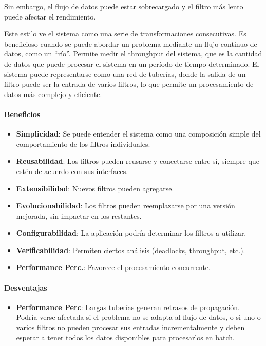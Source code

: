 \documentclass{article}
\begin{document}
			Sin embargo, el flujo de datos puede estar sobrecargado y el filtro más lento puede afectar el rendimiento.
			
			Este estilo ve el sistema como una serie de transformaciones consecutivas. Es beneficioso cuando se puede abordar un problema mediante un flujo continuo de datos, como un ``río''. Permite medir el throughput del sistema, que es la cantidad de datos que puede procesar el sistema en un período de tiempo determinado. El sistema puede representarse como una red de tuberías, donde la salida de un filtro puede ser la entrada de varios filtros, lo que permite un procesamiento de datos más complejo y eficiente.
			\paragraph{Beneficios}
				\begin{itemize}	
					\item {\textbf{Simplicidad}}: Se puede entender el sistema como una composición
					simple del comportamiento de los filtros individuales.
					\item {\textbf{Reusabilidad}}: Los filtros pueden reusarse y conectarse entre sí,
					siempre que estén de acuerdo con sus interfaces.
					\item {\textbf{Extensibilidad}}: Nuevos filtros pueden agregarse.
					\item {\textbf{Evolucionabilidad}}: Los filtros pueden reemplazarse por una versión
					mejorada, sin impactar en los restantes.
					\item {\textbf{Configurabilidad}}: La aplicación podría determinar los filtros a utilizar.
					\item {\textbf{Verificabilidad}}: Permiten ciertos análisis (deadlocks, throughput, etc.).
					\item {\textbf{Performance Perc.}}: Favorece el procesamiento concurrente.
				\end{itemize}
			
			\paragraph{Desventajas}
				\begin{itemize}	
					
					\item {\textbf{Performance Perc}}: Largas tuberías generan retrasos de propagación. Podría verse afectada si el problema no se adapta al flujo de datos, o si uno o varios filtros no pueden procesar sus entradas incrementalmente y deben esperar a tener todos los datos disponibles para procesarlos en batch.
					
				\end{itemize}
			
\end{document}
